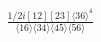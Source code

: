\documentclass[varwidth, border=5pt]{standalone}
\begin{document}
\begin{my}
$\begin{gathered}
\scriptscriptstyle\frac{1/2i[12][23]\langle36\rangle^4}{\langle16\rangle\langle34\rangle\langle45\rangle\langle56\rangle}
\end{gathered}$
\end{my}
\end{document}
